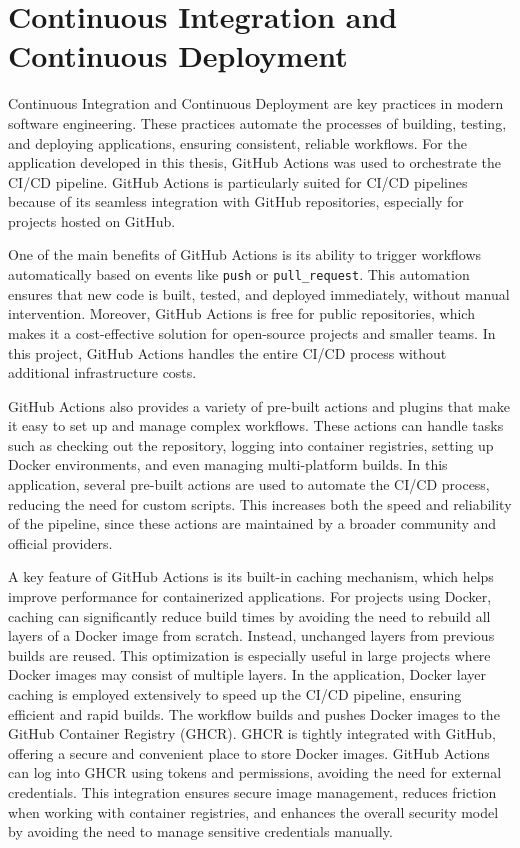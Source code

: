 \section{Continuous Integration and Continuous Deployment}

Continuous Integration and Continuous Deployment are key practices in modern
software engineering. These practices automate the processes of building, testing,
and deploying applications, ensuring consistent, reliable workflows. For the
application developed in this thesis, GitHub Actions was used to orchestrate the
CI/CD pipeline. GitHub Actions is particularly suited for CI/CD pipelines because
of its seamless integration with GitHub repositories, especially for projects
hosted on GitHub.

One of the main benefits of GitHub Actions is its ability to trigger workflows
automatically based on events like \texttt{push} or \texttt{pull\_request}. This
automation ensures that new code is built, tested, and deployed immediately,
without manual intervention. Moreover, GitHub Actions is free for public
repositories, which makes it a cost-effective solution for open-source projects
and smaller teams. In this project, GitHub Actions handles the entire CI/CD process
without additional infrastructure costs.

GitHub Actions also provides a variety of pre-built actions and plugins that make
it easy to set up and manage complex workflows. These actions can handle tasks such
as checking out the repository, logging into container registries, setting up Docker
environments, and even managing multi-platform builds. In this application, several
pre-built actions are used to automate the CI/CD process, reducing the need for
custom scripts. This increases both the speed and reliability of the pipeline,
since these actions are maintained by a broader community and official providers.

A key feature of GitHub Actions is its built-in caching mechanism, which helps
improve performance for containerized applications. For projects using Docker,
caching can significantly reduce build times by avoiding the need to rebuild all
layers of a Docker image from scratch. Instead, unchanged layers from previous
builds are reused. This optimization is especially useful in large projects where
Docker images may consist of multiple layers. In the application, Docker layer
caching is employed extensively to speed up the CI/CD pipeline, ensuring efficient
and rapid builds.
The workflow builds and pushes Docker images to the GitHub Container Registry
(GHCR). GHCR is tightly integrated with GitHub, offering a secure and convenient
place to store Docker images. GitHub Actions can log into GHCR using tokens and
permissions, avoiding the need for external credentials. This integration ensures
secure image management, reduces friction when working with container registries,
and enhances the overall security model by avoiding the need to manage sensitive
credentials manually.

